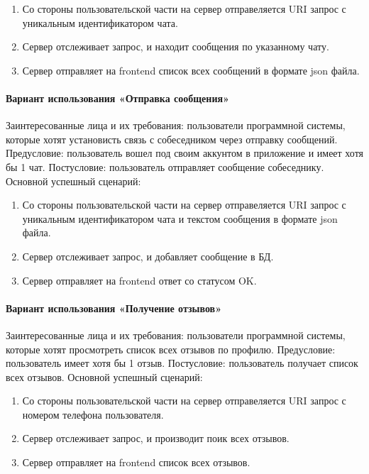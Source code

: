 \begin{enumerate}
	\item Со стороны пользовательской части на сервер отправеляется URI запрос с уникальным идентификатором чата.
	\item Сервер отслеживает запрос, и находит сообщения по указанному чату.
	\item Сервер отправляет на frontend список всех сообщений в формате json файла.
\end{enumerate}

\paragraph{Вариант использования «Отправка сообщения»}
Заинтересованные лица и их требования: пользователи программной системы, которые хотят установисть связь с собеседником через отправку сообщений. Предусловие:  пользователь вошел под своим аккунтом в приложение и имеет хотя бы 1 чат. Постусловие: пользователь отправляет сообщение собеседнику.
Основной успешный сценарий:

\begin{enumerate}
	\item Со стороны пользовательской части на сервер отправеляется URI запрос с уникальным идентификатором чата и текстом сообщения в формате json файла.
	\item Сервер отслеживает запрос, и добавляет сообщение в БД.
	\item Сервер отправляет на frontend ответ со статусом OK.
\end{enumerate}

\paragraph{Вариант использования «Получение отзывов»}
Заинтересованные лица и их требования: пользователи программной системы, которые хотят просмотреть список всех отзывов по профилю. Предусловие:  пользователь имеет хотя бы 1 отзыв. Постусловие: пользователь получает список всех отзывов.
Основной успешный сценарий:

\begin{enumerate}
	\item Со стороны пользовательской части на сервер отправеляется URI запрос с номером телефона пользователя.
	\item Сервер отслеживает запрос, и производит поик всех отзывов.
	\item Сервер отправляет на frontend список всех отзывов.
\end{enumerate}

